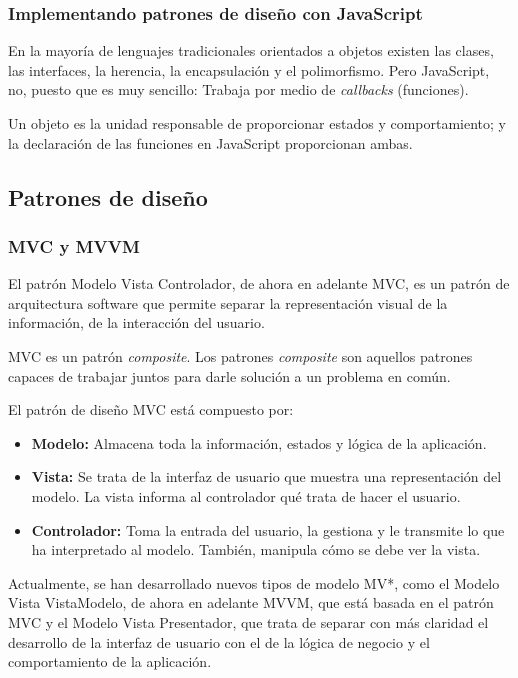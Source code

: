 \subsubsection{Implementando patrones de diseño con JavaScript}
En la mayoría de lenguajes tradicionales orientados a objetos existen las clases, las interfaces, la herencia, la encapsulación y el polimorfismo. Pero JavaScript, no, puesto que es muy sencillo: Trabaja por medio de \textit{callbacks} (funciones).


Un objeto es la unidad responsable de proporcionar estados y comportamiento; y la declaración de las funciones en JavaScript proporcionan ambas\cite{angular_embrace}.


\subsection{Patrones de diseño}
\subsubsection{MVC y MVVM}
El patrón Modelo Vista Controlador, de ahora en adelante MVC, es un patrón de arquitectura software que permite separar la representación visual de la información, de la interacción del usuario. 


MVC es un patrón \textit{composite}. Los patrones \textit{composite} son aquellos patrones capaces de trabajar juntos para darle solución a un problema en común\cite{ericfreemanelisabethfreemanbertbates2004}. 


El patrón de diseño MVC está compuesto por:


\begin{itemize}
\item \textbf{Modelo:} Almacena toda la información, estados y lógica de la aplicación.
\item \textbf{Vista:} Se trata de la interfaz de usuario que muestra una representación del modelo. La vista informa al controlador qué trata de hacer el usuario. 
\item \textbf{Controlador:} Toma la entrada del usuario, la gestiona y le transmite lo que ha interpretado al modelo. También, manipula cómo se debe ver la vista.
\end{itemize}


Actualmente, se han desarrollado nuevos tipos de modelo MV*, como el Modelo Vista VistaModelo, de ahora en adelante MVVM, que está basada en el patrón MVC y el Modelo Vista Presentador, que trata de separar con más claridad el desarrollo de la interfaz de usuario con el de la lógica de negocio y el comportamiento de la aplicación.


